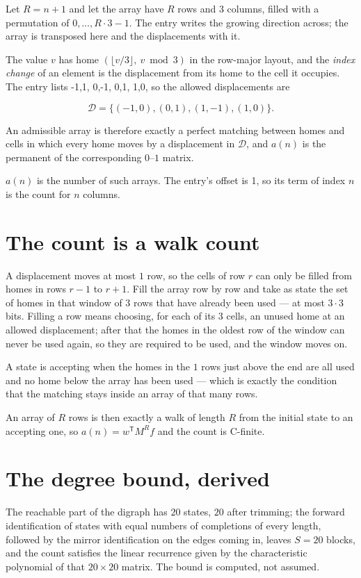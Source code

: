 \documentclass[11pt]{article}
\theoremstyle{definition}
\begin{document}
Let $R = n + 1$ and let the array have $R$ rows and $3$ columns, filled with a permutation of $0,\dots,R\cdot3-1$. The entry writes the growing direction across; the array is transposed here and the displacements with it.

The value $v$ has home $(\lfloor v/3\rfloor,\ v \bmod 3)$ in the row-major layout, and the {\itshape index change} of an element is the displacement from its home to the cell it occupies. The entry lists -1,1, 0,-1, 0,1, 1,0, so the allowed displacements are

\[\mathcal{D} = \{(-1,0), (0,1), (1,-1), (1,0)\}.\]

An admissible array is therefore exactly a perfect matching between homes and cells in which every home moves by a displacement in $\mathcal{D}$, and $a(n)$ is the permanent of the corresponding $0$--$1$ matrix.

$a(n)$ is the number of such arrays. The entry's offset is 1, so its term of index $n$ is the count for $n$ columns.

\section{The count is a walk count}

A displacement moves at most $1$ row, so the cells of row $r$ can only be filled from homes in rows $r-1$ to $r+1$. Fill the array row by row and take as state the set of homes in that window of $3$ rows that have already been used --- at most $3\cdot3$ bits. Filling a row means choosing, for each of its $3$ cells, an unused home at an allowed displacement; after that the homes in the oldest row of the window can never be used again, so they are required to be used, and the window moves on.

A state is accepting when the homes in the $1$ rows just above the end are all used and no home below the array has been used --- which is exactly the condition that the matching stays inside an array of that many rows.

An array of $R$ rows is then exactly a walk of length $R$ from the initial state to an accepting one, so $a(n) = w^{\mathsf T}M^{R}f$ and the count is C-finite.

\section{The degree bound, derived}

The reachable part of the digraph has $20$ states, $20$ after trimming; the forward identification of states with equal numbers of completions of every length, followed by the mirror identification on the edges coming in, leaves $S = 20$ blocks, and the count satisfies the linear recurrence given by the characteristic polynomial of that $20\times20$ matrix. The bound is computed, not assumed.
\end{document}
